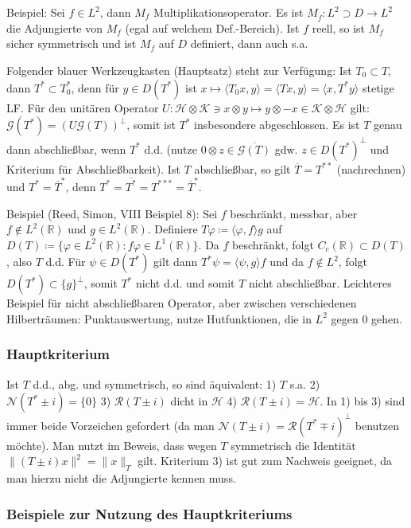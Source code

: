 \documentclass[11pt,a4paper]{scrartcl}
\newcommand{\R}{\mathbb{R}} %
\newcommand{\Hc}{\mathcal{H}}
\newcommand{\Kc}{\mathcal{K}}
\newcommand{\G}{\mathcal{G}}
\newcommand{\Nc}{\mathcal{N}}
\newcommand{\Rc}{\mathcal{R}}
\theoremstyle{plain}
\theoremstyle{definition}
\theoremstyle{remark}
\begin{document}
Beispiel: Sei $f\in L^2$, dann $M_f$ Multiplikationsoperator. Es ist $M_{\overline{f}}: L^2 \supset D \to L^2$ die Adjungierte von $M_f$ (egal auf welchem Def.-Bereich). Ist $f$ reell, so ist $M_f$ sicher symmetrisch und ist $M_f$ auf $D$ definiert, dann auch s.a.

Folgender blauer Werkzeugkasten (Hauptsatz) steht zur Verfügung: Ist $T_0 \subset T$, dann $T^* \subset T_0^*$, denn für $y\in D(T^*)$ ist $x\mapsto \langle T_0 x, y \rangle = \langle Tx, y\rangle = \langle x, T^* y \rangle$ stetige LF. Für den unitären Operator $U: \Hc \otimes \Kc \ni x \otimes y \mapsto y \otimes -x \in \Kc \otimes \Hc$ gilt: $\G(T^*) = (U\G(T))^\perp$, somit ist $T^*$ insbesondere abgeschlossen. Es ist $T$ genau dann abschließbar, wenn $T^*$ d.d. (nutze $0\otimes z \in \overline{\G(T)}$ gdw. $z\in D(T^*)^\perp$ und Kriterium für Abschließbarkeit). Ist $T$ abschließbar, so gilt $\overline{T} = T^{**}$ (nachrechnen) und $T^* = \overline{T}^*$, denn $T^*=\overline{T^*}=T^{***}=\overline{T}^*$.

Beispiel (Reed, Simon, VIII Beispiel 8): Sei $f$ beschränkt, messbar, aber $f\not\in L^2(\R)$ und $g\in L^2(\R)$. Definiere $T\varphi \coloneqq \langle \varphi, f \rangle g$ auf $D(T)\coloneqq \{ \varphi\in L^2(\R): f\varphi \in L^1(\R) \}$. Da $f$ beschränkt, folgt $C_c(\R) \subset D(T)$, also $T$ d.d. Für $\psi \in D(T^*)$ gilt dann $T^*\psi = \langle \psi, g \rangle f$ und da $f\not \in L^2$, folgt $D(T^*) \subset \{ g \}^\perp$, somit $T^*$ nicht d.d. und somit $T$ nicht abschließbar. Leichteres Beispiel für nicht abschließbaren Operator, aber zwischen verschiedenen Hilberträumen: Punktauswertung, nutze Hutfunktionen, die in $L^2$ gegen $0$ gehen.

\subsubsection{Hauptkriterium}

Ist $T$ d.d., abg. und symmetrisch, so sind äquivalent: 1) $T$ s.a. 2) $\Nc(T^*\pm i)=\{0\}$ 3) $\Rc(T\pm i)$ dicht in $\Hc$ 4) $\Rc(T\pm i)=\Hc$. In 1) bis 3) sind immer beide Vorzeichen gefordert (da man $\Nc(T\pm i)=\Rc(T^*\mp i)^\perp$ benutzen möchte). Man nutzt im Beweis, dass wegen $T$ symmetrisch die Identität $\|(T\pm i)x\|^2=\|x\|_T$ gilt. Kriterium 3) ist gut zum Nachweis geeignet, da man hierzu nicht die Adjungierte kennen muss.

\subsubsection{Beispiele zur Nutzung des Hauptkriteriums}
\end{document}
